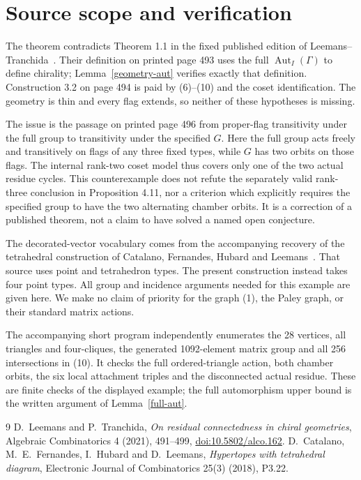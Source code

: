 \documentclass[11pt,a4paper]{article}
\newcommand{\Aut}{\operatorname{Aut}}
\begin{document}
\section{Source scope and verification}
The theorem contradicts Theorem 1.1 in the fixed published
edition of Leemans--Tranchida~\cite{source}. Their definition
on printed page 493 uses the full $\Aut_I(\Gamma)$ to define
chirality; Lemma~\ref{geometry-aut} verifies exactly that
definition. Construction 3.2 on page 494 is paid by (6)--(10)
and the coset identification. The geometry is thin and every
flag extends, so neither of these hypotheses is missing.

The issue is the passage on printed page 496 from proper-flag
transitivity under the full group to transitivity under the
specified $G$. Here the full group acts freely and transitively
on flags of any three fixed types, while $G$ has two orbits on
those flags. The internal rank-two coset model thus covers
only one of the two actual residue cycles. This counterexample
does not refute the separately valid rank-three conclusion in
Proposition 4.11, nor a criterion which explicitly requires
the specified group to have the two alternating chamber orbits.
It is a correction of a published theorem, not a claim to
have solved a named open conjecture.

The decorated-vector vocabulary comes from the accompanying
recovery of the tetrahedral construction of Catalano, Fernandes,
Hubard and Leemans~\cite{tetrahedral}. That source uses point
and tetrahedron types. The present construction instead takes
four point types. All group and incidence arguments needed
for this example are given here. We make no claim of priority
for the graph (1), the Paley graph, or their standard matrix
actions.

The accompanying short program independently enumerates the
28 vertices, all triangles and four-cliques, the generated
1092-element matrix group and all 256 intersections in (10).
It checks the full ordered-triangle action, both chamber
orbits, the six local attachment triples and the disconnected
actual residue. These are finite checks of the displayed
example; the full automorphism upper bound is the written
argument of Lemma~\ref{full-aut}.

\begin{thebibliography}{9}
 D.~Leemans and P.~Tranchida,
\emph{On residual connectedness in chiral geometries},
Algebraic Combinatorics 4 (2021), 491--499,
\href{https://doi.org/10.5802/alco.162}{doi:10.5802/alco.162}.
 D.~Catalano, M.~E.~Fernandes, I.~Hubard and
D.~Leemans, \emph{Hypertopes with tetrahedral diagram},
Electronic Journal of Combinatorics 25(3) (2018), P3.22.
\end{thebibliography}
\end{document}
